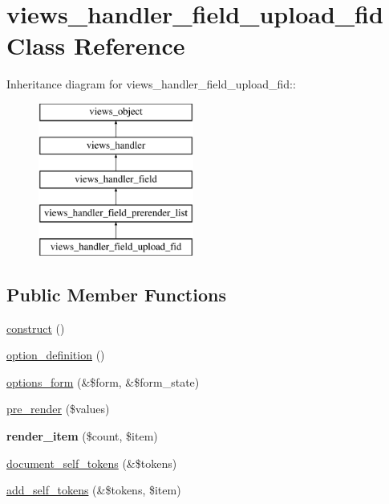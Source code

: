 \hypertarget{classviews__handler__field__upload__fid}{
\section{views\_\-handler\_\-field\_\-upload\_\-fid Class Reference}
\label{classviews__handler__field__upload__fid}
}
Inheritance diagram for views\_\-handler\_\-field\_\-upload\_\-fid::\begin{figure}[H]
\begin{center}
\leavevmode
\includegraphics[height=5cm]{classviews__handler__field__upload__fid}
\end{center}
\end{figure}
\subsection*{Public Member Functions}
\begin{CompactItemize}
\item 
\hyperlink{classviews__handler__field__upload__fid_e651b7971cdda48c84d470f5c86cf492}{construct} ()
\item 
\hyperlink{classviews__handler__field__upload__fid_740ca6ec94e724e23023400ddbeb5978}{option\_\-definition} ()
\item 
\hyperlink{classviews__handler__field__upload__fid_b39479eb80cfba952037f37e930d1b6e}{options\_\-form} (\&\$form, \&\$form\_\-state)
\item 
\hyperlink{classviews__handler__field__upload__fid_5f4bd6d947086120d041e1e27571804d}{pre\_\-render} (\$values)
\item 
\hypertarget{classviews__handler__field__upload__fid_6d5523341960275aa89a1330ead44d36}{
\textbf{render\_\-item} (\$count, \$item)}
\label{classviews__handler__field__upload__fid_6d5523341960275aa89a1330ead44d36}

\item 
\hyperlink{classviews__handler__field__upload__fid_8e3f8fc239933c8c09c723dcada273de}{document\_\-self\_\-tokens} (\&\$tokens)
\item 
\hyperlink{classviews__handler__field__upload__fid_0366e80867739ae07af5ee910d3022be}{add\_\-self\_\-tokens} (\&\$tokens, \$item)
\end{CompactItemize}


